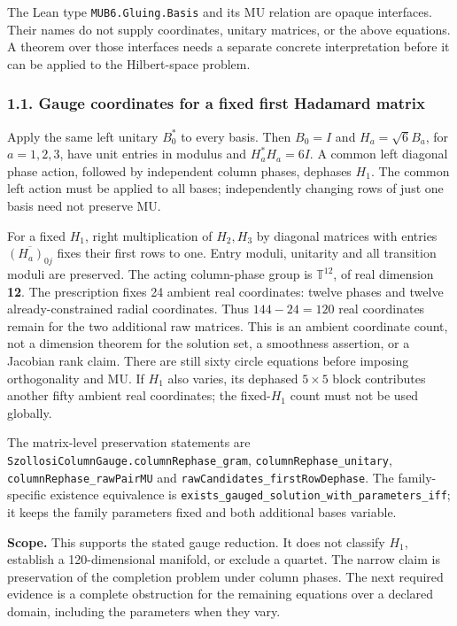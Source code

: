 \documentclass[
]{article}
\begin{document}
The Lean type \nolinkurl{MUB6.Gluing.Basis} and its MU relation are
opaque interfaces. Their names do not supply coordinates, unitary
matrices, or the above equations. A theorem over those interfaces needs
a separate concrete interpretation before it can be applied to the
Hilbert-space problem.

\subsubsection{1.1. Gauge coordinates for a fixed first Hadamard
matrix}\label{gauge-coordinates-for-a-fixed-first-hadamard-matrix}

Apply the same left unitary \(B_0^*\) to every basis. Then \(B_0=I\) and
\(H_a=\sqrt6 B_a\), for \(a=1,2,3\), have unit entries in modulus and
\(H_a^*H_a=6I\). A common left diagonal phase action, followed by
independent column phases, dephases \(H_1\). The common left action must
be applied to all bases; independently changing rows of just one basis
need not preserve MU.

For a fixed \(H_1\), right multiplication of \(H_2,H_3\) by diagonal
matrices with entries \(\overline{(H_a)_{0j}}\) fixes their first rows
to one. Entry moduli, unitarity and all transition moduli are preserved.
The acting column-phase group is \(\mathbb T^{12}\), of real dimension
\textbf{12}. The prescription fixes 24 ambient real coordinates: twelve
phases and twelve already-constrained radial coordinates. Thus
\(144-24=120\) real coordinates remain for the two additional raw
matrices. This is an ambient coordinate count, not a dimension theorem
for the solution set, a smoothness assertion, or a Jacobian rank claim.
There are still sixty circle equations before imposing orthogonality and
MU. If \(H_1\) also varies, its dephased \(5\times5\) block contributes
another fifty ambient real coordinates; the fixed-\(H_1\) count must not
be used globally.

The matrix-level preservation statements are
\nolinkurl{SzollosiColumnGauge.columnRephase_gram},
\nolinkurl{columnRephase_unitary}, \nolinkurl{columnRephase_rawPairMU}
and \nolinkurl{rawCandidates_firstRowDephase}. The family-specific
existence equivalence is
\nolinkurl{exists_gauged_solution_with_parameters_iff}; it keeps the
family parameters fixed and both additional bases variable.

\textbf{Scope.} This supports the stated gauge reduction. It does not
classify \(H_1\), establish a 120-dimensional manifold, or exclude a
quartet. The narrow claim is preservation of the completion problem
under column phases. The next required evidence is a complete
obstruction for the remaining equations over a declared domain,
including the parameters when they vary.
\end{document}
